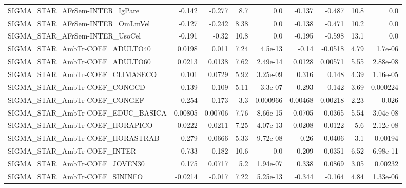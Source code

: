 \begin{tabular}{lrrrrrrrr}
SIGMA\_STAR\_AFrSem-INTER\_IgPare        &      -0.142 &       -0.277 &     8.7 &      0.0 &     -0.137 &      -0.487 &         10.8 &           0.0 \\
SIGMA\_STAR\_AFrSem-INTER\_OmLmVel       &      -0.127 &       -0.242 &    8.38 &      0.0 &     -0.138 &      -0.471 &         10.2 &           0.0 \\
SIGMA\_STAR\_AFrSem-INTER\_UsoCel        &      -0.191 &        -0.32 &    10.8 &      0.0 &     -0.195 &      -0.598 &         13.1 &           0.0 \\
SIGMA\_STAR\_AmbTr-COEF\_ADULTO40        &      0.0198 &        0.011 &    7.24 &  4.5e-13 &      -0.14 &     -0.0518 &         4.79 &       1.7e-06 \\
SIGMA\_STAR\_AmbTr-COEF\_ADULTO60        &      0.0213 &       0.0138 &    7.62 & 2.49e-14 &     0.0128 &     0.00571 &         5.55 &      2.88e-08 \\
SIGMA\_STAR\_AmbTr-COEF\_CLIMASECO       &       0.101 &       0.0729 &    5.92 & 3.25e-09 &      0.316 &       0.148 &         4.39 &      1.16e-05 \\
SIGMA\_STAR\_AmbTr-COEF\_CONGCD          &       0.139 &        0.109 &    5.11 &  3.3e-07 &      0.293 &       0.142 &         3.69 &      0.000224 \\
SIGMA\_STAR\_AmbTr-COEF\_CONGEF          &       0.254 &        0.173 &     3.3 & 0.000966 &    0.00468 &     0.00218 &         2.23 &         0.026 \\
SIGMA\_STAR\_AmbTr-COEF\_EDUC\_BASICA     &     0.00805 &      0.00706 &    7.76 & 8.66e-15 &    -0.0705 &     -0.0365 &         5.54 &      3.04e-08 \\
SIGMA\_STAR\_AmbTr-COEF\_HORAPICO        &      0.0222 &       0.0211 &    7.25 & 4.07e-13 &     0.0208 &      0.0122 &          5.6 &      2.12e-08 \\
SIGMA\_STAR\_AmbTr-COEF\_HORASTRAB       &      -0.279 &      -0.0666 &    5.33 & 9.72e-08 &       0.26 &      0.0406 &          3.1 &       0.00194 \\
SIGMA\_STAR\_AmbTr-COEF\_INTER           &      -0.733 &       -0.182 &    10.6 &      0.0 &     -0.209 &     -0.0351 &         6.52 &      6.98e-11 \\
SIGMA\_STAR\_AmbTr-COEF\_JOVEN30         &       0.175 &       0.0717 &     5.2 & 1.94e-07 &      0.338 &      0.0869 &         3.05 &       0.00232 \\
SIGMA\_STAR\_AmbTr-COEF\_SININFO         &     -0.0214 &       -0.017 &    7.22 & 5.25e-13 &     -0.344 &      -0.164 &         4.84 &      1.33e-06 \\

\end{tabular}
